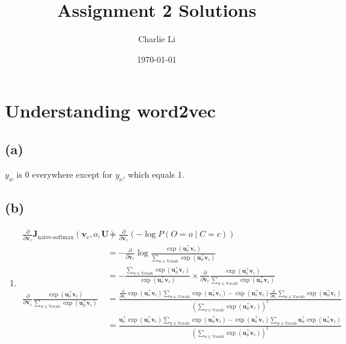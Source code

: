\documentclass[11pt]{article}
\title{Assignment 2 Solutions}
\author{Charlie Li}
\date{\today}
\newcommand{\bvec}[1]{\textbf{#1}}
\begin{document}
\maketitle

\section{Understanding word2vec}
\subsection*{(a)}
$y_w$ is 0 everywhere except for $y_o$, which equals 1.

\subsection*{(b)}
\begin{enumerate}
  \item 
  \begin{align*}
  \frac{\partial}{\partial \bvec{v}_c} \bvec{J}_{\text{naive-softmax}}(\bvec{v}_c, o, \bvec{U})
    &= \frac{\partial}{\partial \bvec{v}_c} \left(-\log P(O=o \mid C=c)\right) \\
    &= - \frac{\partial}{\partial \bvec{v}_c} \log \frac{\exp(\bvec{u}_o^{\top}\bvec{v}_c)}{\sum_{w\in \text{Vocab}} \exp(\bvec{u}_w^{\top}\bvec{v}_c)} \\
    &=  -\frac{\sum_{w\in \text{Vocab}} \exp(\bvec{u}_w^{\top}\bvec{v}_c)}{\exp(\bvec{u}_o^{\top}\bvec{v}_c)}\times \frac{\partial}{\partial \bvec{v}_c} \frac{\exp(\bvec{u}_o^{\top}\bvec{v}_c)}{\sum_{w\in \text{Vocab}} \exp(\bvec{u}_w^{\top}\bvec{v}_c)} \\
  \frac{\partial}{\partial \bvec{v}_c} \frac{\exp(\bvec{u}_o^{\top}\bvec{v}_c)}{\sum_{w\in \text{Vocab}} \exp(\bvec{u}_w^{\top}\bvec{v}_c)}  
    &= \frac{
      \frac{\partial}{\partial \bvec{v}_c} \exp(\bvec{u}_o^{\top}\bvec{v}_c) \sum_{w\in \text{Vocab}} \exp(\bvec{u}_w^{\top}\bvec{v}_c)
      - \exp(\bvec{u}_o^{\top}\bvec{v}_c) \frac{\partial}{\partial \bvec{v}_c} \sum_{w\in \text{Vocab}} \exp(\bvec{u}_w^{\top}\bvec{v}_c)
    }{
      \left(\sum_{w\in \text{Vocab}} \exp(\bvec{u}_w^{\top}\bvec{v}_c)\right)^2
    } \\
    &= \frac{
      \bvec{u}_o^{\top}\exp(\bvec{u}_o^{\top}\bvec{v}_c) \sum_{w\in \text{Vocab}} \exp(\bvec{u}_w^{\top}\bvec{v}_c) - \exp(\bvec{u}_o^{\top}\bvec{v}_c) \sum_{w\in \text{Vocab}} \bvec{u}_w^{\top} \exp(\bvec{u}_w^{\top}\bvec{v}_c)
    }{
      \left(\sum_{w\in \text{Vocab}} \exp(\bvec{u}_w^{\top}\bvec{v}_c)\right)^2
}
\end{align*}
\end{enumerate}
\end{document}
